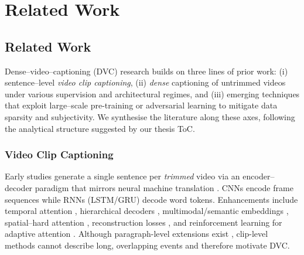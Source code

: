 
\chapter{Related Work}
\label{chap:related_work}

\section{Related Work}

Dense–video–captioning (DVC) research builds on three lines of prior work:  
(i) sentence–level \emph{video clip captioning},  
(ii) \emph{dense} captioning of untrimmed videos under various supervision and architectural regimes, and  
(iii) emerging techniques that exploit large–scale pre-training or adversarial learning to mitigate data sparsity and subjectivity.  
We synthesise the literature along these axes, following the analytical structure suggested by our thesis ToC.

\subsection{Video Clip Captioning}
Early studies generate a single sentence per \emph{trimmed} video via an encoder–decoder paradigm that mirrors neural machine translation \cite{sutskever2014sequence,cho-etal-2014-learning}.  
CNNs encode frame sequences while RNNs (LSTM/GRU) \cite{venugopalan2015sequence,venugopalan2015translating} decode word tokens.  
Enhancements include temporal attention \cite{yao2015describing}, hierarchical decoders \cite{pan2016hierarchical,baraldi2017hierarchical}, multimodal/semantic embeddings \cite{pan2016jointly,gan2017semantic,pan2017video,yu2017end}, spatial–hard attention \cite{liu2018fine}, reconstruction losses \cite{wang2018reconstruction}, and reinforcement learning for adaptive attention \cite{xiao2019video}.  
Although paragraph-level extensions exist \cite{yu2016video,xiong2018move,lei2020mart}, clip-level methods cannot describe long, overlapping events and therefore motivate DVC.

